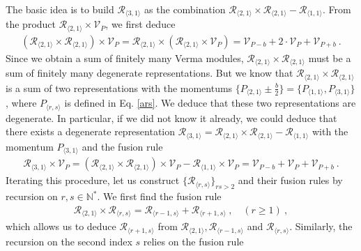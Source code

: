\documentclass[12pt, a4paper, notitlepage, twoside]{report}
\numberwithin{equation}{section}
\theoremstyle{break}
\begin{document}
The basic idea is to build $\mathcal{R}_{\langle 3, 1\rangle}$ as the combination $\mathcal{R}_{\langle 2,1 \rangle} \times \mathcal{R}_{\langle 2,1 \rangle} - \mathcal{R}_{\langle 1,1 \rangle}$.
From the product $\mathcal{R}_{\langle 2,1 \rangle}\times \mathcal{V}_P$, we first deduce 
\begin{align}
 \left(\mathcal{R}_{\langle 2,1 \rangle}\times \mathcal{R}_{\langle 2,1 \rangle}\right)\times\mathcal{V}_P = \mathcal{R}_{\langle 2,1 \rangle}\times \left(\mathcal{R}_{\langle 2,1 \rangle}\times\mathcal{V}_P\right) = 
 \mathcal{V}_{P-b} + 2\cdot \mathcal{V}_P + \mathcal{V}_{P+b}\ .
\end{align}
Since we obtain a sum of finitely many Verma modules, $\mathcal{R}_{\langle 2,1 \rangle}\times \mathcal{R}_{\langle 2,1 \rangle}$ must be a sum of finitely many degenerate representations. But we know that $\mathcal{R}_{\langle 2,1 \rangle}\times \mathcal{R}_{\langle 2,1 \rangle}$ is a sum of two representations with the momentums $\{P_{\langle 2,1 \rangle} \pm \frac{b}{2}\} = \{P_{\langle 1,1\rangle}, P_{\langle 3,1\rangle}\}$, where $P_{\langle r,s\rangle}$ is defined in Eq. \eqref{ars}. 
We deduce that these two representations are degenerate. In particular, if we did not know it already, we could deduce that there exists a degenerate representation $\mathcal{R}_{\langle 3, 1\rangle}=\mathcal{R}_{\langle 2,1 \rangle}\times \mathcal{R}_{\langle 2,1 \rangle} -\mathcal{R}_{\langle 1,1\rangle}$ with the momentum $P_{\langle 3,1\rangle}$ and the fusion rule 
\begin{align}
 \mathcal{R}_{\langle 3, 1\rangle}\times \mathcal{V}_P = \left(\mathcal{R}_{\langle 2,1 \rangle}\times \mathcal{R}_{\langle 2,1 \rangle}\right)\times\mathcal{V}_P - \mathcal{R}_{\langle 1,1\rangle}\times \mathcal{V}_P =  \mathcal{V}_{P-b} + \mathcal{V}_P + \mathcal{V}_{P+b}\ .
\end{align}
Iterating this procedure, let us construct $\{\mathcal{R}_{\langle r,s\rangle}\}_{rs>2}$  and their fusion rules by recursion on $r,s\in\mathbb{N}^*$. 
We first find the fusion rule 
\begin{align}
\mathcal{R}_{\langle 2,1\rangle}\times \mathcal{R}_{\langle r,s\rangle} = \mathcal{R}_{\langle r-1,s\rangle} + \mathcal{R}_{\langle r+1,s\rangle }\ , \quad (r\geq 1)\ ,
\label{rtod}
\end{align}
which allows us to deduce $\mathcal{R}_{\langle r+1,s\rangle}$ from $\mathcal{R}_{\langle 2,1\rangle}, \mathcal{R}_{\langle r-1,s\rangle}$ and $\mathcal{R}_{\langle r,s\rangle}$. Similarly, the recursion on the second index $s$ relies on the fusion rule 
\end{document}
